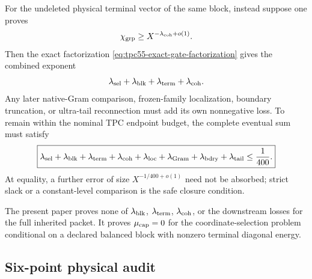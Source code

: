 For the undeleted physical terminal vector of the same block, instead
suppose one proves
\begin{equation}
 \chi_{\rm grp}\ge X^{-\lambda_{\rm coh}+o(1)}.
 \label{eq:tpc55-coherence-loss}
\end{equation}
Then the exact factorization
\eqref{eq:tpc55-exact-gate-factorization} gives the combined exponent
\begin{equation}
 \lambda_{\rm sel}+\lambda_{\rm blk}
 +\lambda_{\rm term}+\lambda_{\rm coh}.
 \label{eq:tpc55-full-output-ledger}
\end{equation}
Any later native-Gram comparison, frozen-family localization, boundary
truncation, or ultra-tail reconnection must add its own nonnegative loss.
To remain within the nominal TPC endpoint budget, the complete eventual
sum must satisfy
\begin{equation}
 \boxed{
 \lambda_{\rm sel}+\lambda_{\rm blk}
 +\lambda_{\rm term}+\lambda_{\rm coh}+\lambda_{\rm loc}
 +\lambda_{\rm Gram}+\lambda_{\rm bdry}+\lambda_{\rm tail}
 \le\frac1{400}.}
 \label{eq:tpc55-full-endpoint-budget}
\end{equation}
At equality, a further error of size \(X^{-1/400+o(1)}\) need not be
absorbed; strict slack or a constant-level comparison is the safe closure
condition.

The present paper proves none of \(\lambda_{\rm blk}\),
\(\lambda_{\rm term}\), \(\lambda_{\rm coh}\), or the downstream losses
for the full inherited packet.  It proves \(\mu_{\rm cap}=0\) for the
coordinate-selection problem conditional on a declared balanced block with
nonzero terminal diagonal energy.

\subsection{Six-point physical audit}

